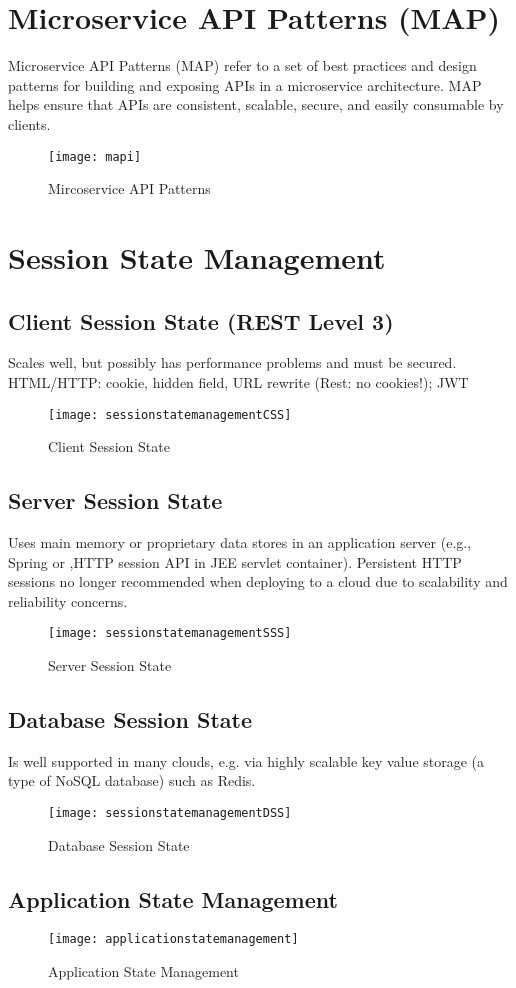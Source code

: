 \section{Microservice API Patterns (MAP)}
Microservice API Patterns (MAP) refer to a set of best practices and design patterns for building and exposing APIs in a microservice architecture. MAP helps ensure that APIs are consistent, scalable, secure, and easily consumable by clients.

\begin{figure}[H]
  \center
  \texttt{[image: mapi]}
  \caption{Mircoservice API Patterns}
\end{figure}

\section{Session State Management}
\subsection{Client Session State (REST Level 3)}
Scales well, but possibly has performance problems and must be secured.
HTML/HTTP: cookie, hidden field, URL rewrite (Rest: no cookies!); JWT

\begin{figure}[H]
  \center
  \texttt{[image: sessionstatemanagementCSS]}
  \caption{Client Session State}
\end{figure}

\subsection{Server Session State}
Uses main memory or proprietary data stores in an application server (e.g., Spring or ,HTTP session API in JEE servlet container).
Persistent HTTP sessions no longer recommended when deploying to a cloud due to scalability and reliability concerns.

\begin{figure}[H]
  \center
  \texttt{[image: sessionstatemanagementSSS]}
  \caption{Server Session State}
\end{figure}

\subsection{Database Session State}
Is well supported in many clouds, e.g. via highly scalable key value storage (a type of NoSQL database) such as Redis.

\begin{figure}[H]
  \center
  \texttt{[image: sessionstatemanagementDSS]}
  \caption{Database Session State}
\end{figure}

\subsection{Application State Management}
\begin{figure}[H]
  \center
  \texttt{[image: applicationstatemanagement]}
  \caption{Application State Management}
\end{figure}
